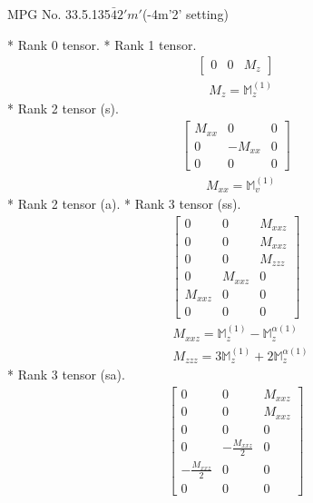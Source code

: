 \documentclass[fleqn,8pt,landscape]{jsarticle}
\begin{document}
\setcounter{MaxMatrixCols}{32}

\renewcommand{\tablename}{Table~}
\renewcommand{\figurename}{Figure~}
\begin{center}
\LARGE
MPG No. 33.5.135\quad$\bar{4}2'm'$\quad(-4m'2' setting)
\end{center}
* Rank 0 tensor.
* Rank 1 tensor.
\begin{align*}
\begin{bmatrix} 0 & 0 & M_{z} \end{bmatrix}
\end{align*}
\begin{align*}
& M_{z} = \mathbb{M}_{z}^{(1)}
\end{align*}
* Rank 2 tensor (s).
\begin{align*}
\begin{bmatrix} M_{xx} & 0 & 0 \\ 0 & - M_{xx} & 0 \\ 0 & 0 & 0 \end{bmatrix}
\end{align*}
\begin{align*}
& M_{xx} = \mathbb{M}_{v}^{(1)}
\end{align*}
* Rank 2 tensor (a).
* Rank 3 tensor (ss).
\begin{align*}
\begin{bmatrix} 0 & 0 & M_{xxz} \\ 0 & 0 & M_{xxz} \\ 0 & 0 & M_{zzz} \\ 0 & M_{xxz} & 0 \\ M_{xxz} & 0 & 0 \\ 0 & 0 & 0 \end{bmatrix}
\end{align*}
\begin{align*}
& M_{xxz} = \mathbb{M}_{z}^{(1)} - \mathbb{M}_{z}^{\alpha(1)} \\
& M_{zzz} = 3 \mathbb{M}_{z}^{(1)} + 2 \mathbb{M}_{z}^{\alpha(1)}
\end{align*}
* Rank 3 tensor (sa).
\begin{align*}
\begin{bmatrix} 0 & 0 & M_{xxz} \\ 0 & 0 & M_{xxz} \\ 0 & 0 & 0 \\ 0 & - \frac{M_{xxz}}{2} & 0 \\ - \frac{M_{xxz}}{2} & 0 & 0 \\ 0 & 0 & 0 \end{bmatrix}
\end{align*}
\end{document}
